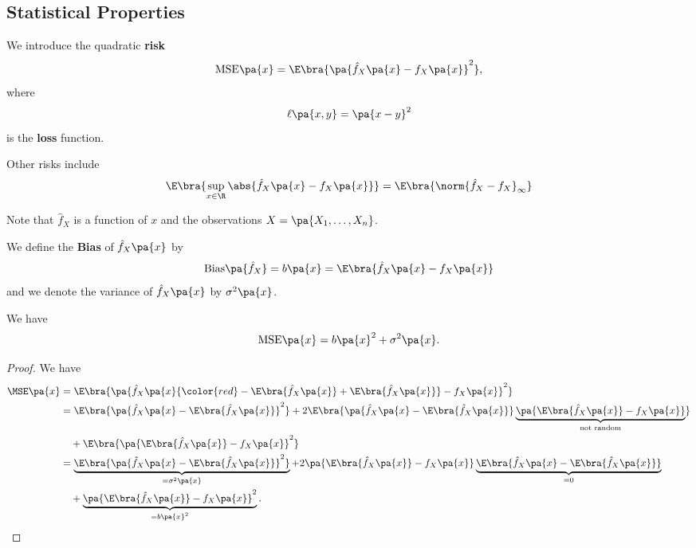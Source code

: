 \subsection{Statistical Properties}
\begin{definition}
  We introduce the quadratic \textbf{risk}
  \begin{equation}
    \mathrm{MSE}\pa{x} = \E\bra{\pa{\hat{f}_X\pa{x} - f_X\pa{x}}^2},
  \end{equation}
  where
  \begin{equation}
    \ell\pa{x,y} = \pa{x-y}^2
  \end{equation}
  is the \textbf{loss} function.

  Other risks include
  \begin{equation}
    \E\bra{\sup_{x\in \R} \abs{\hat{f}_X\pa{x}-f_X\pa{x}}} = \E\bra{\norm{\hat{f}_X-f_X }_\infty}
  \end{equation}
\end{definition}
Note that $\hat{f}_X$ is a function of $x$ and the observations $X= \pa{X_1,\ldots, X_n}$.

\begin{definition}
  We define the \textbf{Bias} of $\hat{f}_X\pa{x}$ by
  \begin{equation}
    \mathrm{Bias}\pa{\hat{f}_X} = b\pa{x} = \E\bra{\hat{f}_X\pa{x} - f_X\pa{x}}
  \end{equation}
  and we denote the variance of $\hat{f}_X\pa{x}$ by $\sigma^2\pa{x}$.
\end{definition}

\begin{proposition}
  We have
  \begin{equation}
    \mathrm{MSE}\pa{x} = b\pa{x}^2 + \sigma^2\pa{x}.
  \end{equation}
\end{proposition}
\begin{proof}
We have
  \begin{equation}
    \begin{split}
      \MSE\pa{x} &= \E\bra{ \pa{\hat{f}_X\pa{x} {\color{red}- \E\bra{\hat{f}_X\pa{x}} + \E\bra{\hat{f}_X\pa{x}}} - f_X\pa{x}}^2} \\
      &= \E\bra{ \pa{\hat{f}_X\pa{x} - \E\bra{\hat{f}_X\pa{x}}}^2} + 2 \E\bra{\pa{\hat{f}_X\pa{x}- \E\bra{\hat{f}_X\pa{x}}}\underbrace{\pa{\E\bra{\hat{f}_X\pa{x}} - f_X\pa{x}}}_{\text{not random}} } \\
      &\quad + \E\bra{\pa{\E\bra{\hat{f}_X\pa{x}} - f_X\pa{x}}^2} \\
      &= \underbrace{\E\bra{ \pa{\hat{f}_X\pa{x} - \E\bra{\hat{f}_X\pa{x}}}^2}}_{=\sigma^2\pa{x}} + 2 \pa{\E\bra{\hat{f}_X\pa{x}} - f_X\pa{x}} \underbrace{\E\bra{\hat{f}_X\pa{x}- \E\bra{\hat{f}_X\pa{x}}} }_{=0} \\
      &\quad + \underbrace{\pa{\E\bra{\hat{f}_X\pa{x}} - f_X\pa{x}}^2}_{=b\pa{x}^2}. \\
    \end{split}
  \end{equation}
\end{proof}

